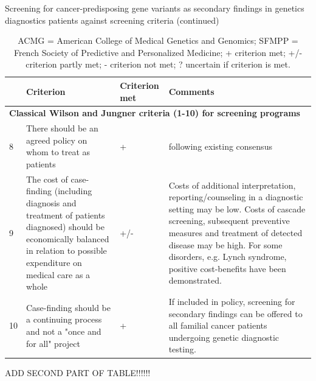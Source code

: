 \begin{table}
	\footnotesize
	\caption{\label{table:summary}Screening for cancer-predisposing gene variants as secondary findings in genetics diagnostics patients against screening criteria (continued)}
	\begin{tabular}{ p{0.5cm} p{5.5cm} p{2cm} p{7cm} }
		& \footnotesize{\textbf{Criterion}} & \footnotesize{\textbf{Criterion met}} & \footnotesize{\textbf{Comments}} \\
		\hline
	
		\multicolumn{4}{|l|}{\textbf{Classical Wilson and Jungner criteria (1-10) for screening programs \cite{Andermann_2008}}} \\
	
		\hline

		8 & There should be an agreed policy on whom to treat as patients & + & following existing consensus \\
		9 & The cost of case-finding (including diagnosis and treatment of patients diagnosed) should be economically balanced in relation to possible expenditure on medical care as a whole & +/- & Costs of additional interpretation, reporting/counseling in a diagnostic setting may be low. Costs of cascade screening, subsequent preventive measures and treatment of detected disease may be high. For some disorders, e.g. Lynch syndrome, positive cost-benefits have been demonstrated. \\
		10 & Case-finding should be a continuing process and not a "once and for all" project & + & If included in policy, screening for secondary findings can be offered to all familial cancer patients undergoing genetic diagnostic testing. \\
		\hline
	\end{tabular}
	\caption*{ACMG = American College of Medical Genetics and Genomics; SFMPP = French Society of Predictive and Personalized Medicine; + criterion met; +/- criterion partly met; - criterion not met; ? uncertain if criterion is met.}
\end{table}

ADD SECOND PART OF TABLE!!!!!!


